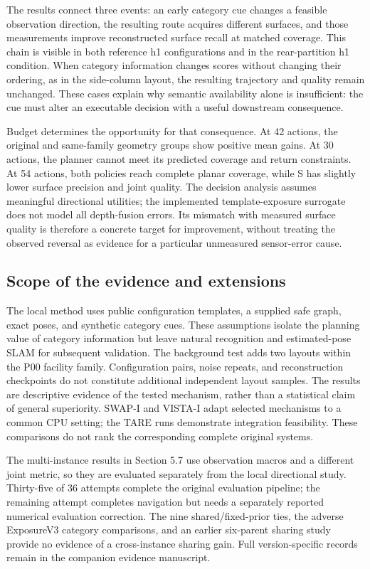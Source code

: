 \documentclass[11pt,a4paper]{article}
\providecommand{\hypertarget}[2]{#2}
\begin{document}
The results connect three events: an early category cue changes a feasible observation direction, the resulting route acquires different surfaces, and those measurements improve reconstructed surface recall at matched coverage. This chain is visible in both reference h1 configurations and in the rear-partition h1 condition. When category information changes scores without changing their ordering, as in the side-column layout, the resulting trajectory and quality remain unchanged. These cases explain why semantic availability alone is insufficient: the cue must alter an executable decision with a useful downstream consequence.

Budget determines the opportunity for that consequence. At 42 actions, the original and same-family geometry groups show positive mean gains. At 30 actions, the planner cannot meet its predicted coverage and return constraints. At 54 actions, both policies reach complete planar coverage, while S has slightly lower surface precision and joint quality. The decision analysis assumes meaningful directional utilities; the implemented template-exposure surrogate does not model all depth-fusion errors. Its mismatch with measured surface quality is therefore a concrete target for improvement, without treating the observed reversal as evidence for a particular unmeasured sensor-error cause.

\hypertarget{scope-of-the-evidence-and-extensions}{%
\subsection{Scope of the evidence and extensions}\label{scope-of-the-evidence-and-extensions}}

The local method uses public configuration templates, a supplied safe graph, exact poses, and synthetic category cues. These assumptions isolate the planning value of category information but leave natural recognition and estimated-pose SLAM for subsequent validation. The background test adds two layouts within the P00 facility family. Configuration pairs, noise repeats, and reconstruction checkpoints do not constitute additional independent layout samples. The results are descriptive evidence of the tested mechanism, rather than a statistical claim of general superiority. SWAP-I and VISTA-I adapt selected mechanisms to a common CPU setting; the TARE runs demonstrate integration feasibility. These comparisons do not rank the corresponding complete original systems.

The multi-instance results in Section 5.7 use observation macros and a different joint metric, so they are evaluated separately from the local directional study. Thirty-five of 36 attempts complete the original evaluation pipeline; the remaining attempt completes navigation but needs a separately reported numerical evaluation correction. The nine shared/fixed-prior ties, the adverse ExposureV3 category comparisons, and an earlier six-parent sharing study provide no evidence of a cross-instance sharing gain. Full version-specific records remain in the companion evidence manuscript.
\end{document}
